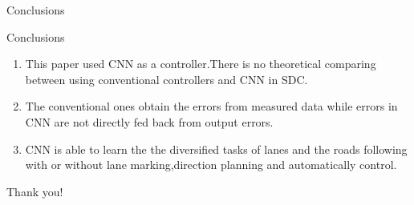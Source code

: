 \documentclass{beamer}
\begin{document}
\begin{frame}{Conclusions}
\begin{block}{Conclusions}
\begin{enumerate}
    \item This paper used CNN as a controller.There is no theoretical comparing between using conventional controllers and CNN in SDC.
    \item The conventional ones obtain the errors from measured data while errors in CNN are not directly fed back from output errors. 
    \item CNN is able to learn the the diversified tasks of lanes and the roads following with or without lane marking,direction planning and automatically control.
\end{enumerate}
\end{block}  

\begin{center}
    Thank you!
\end{center}
\end{frame}
\end{document}
